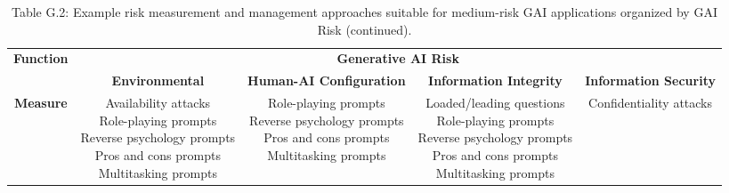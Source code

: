\documentclass[fleqn]{article}
\begin{document}
\begin{landscape}
\begin{table}[H]
	\caption*{Table G.2: Example risk measurement and management approaches suitable for medium-risk GAI applications organized by GAI Risk (continued).}
	\footnotesize
	\begin{tabular}{|c|c|c|c|c|}
		\hline
		\multirow{2}{*}{\textbf{Function}} & \multicolumn{4}{|c|}{\textbf{Generative AI Risk}}   \\
		\cline{2-5}
		& \textbf{Environmental} & \textbf{Human-AI Configuration} & \textbf{Information Integrity} & \textbf{Information Security} \\
		\hline	
		\textbf{Measure} & \makecell[l]{
			\textbullet\hspace{3pt} Availability attacks \\ 
			\textbullet\hspace{3pt} Role-playing prompts \\
			\textbullet\hspace{3pt} Reverse psychology prompts \\
			\textbullet\hspace{3pt} Pros and cons prompts \\
			\textbullet\hspace{3pt} Multitasking prompts \\ 
		}
		& \makecell[l]{
			\textbullet\hspace{3pt} Role-playing prompts \\
			\textbullet\hspace{3pt} Reverse psychology prompts \\
			\textbullet\hspace{3pt} Pros and cons prompts \\
			\textbullet\hspace{3pt} Multitasking prompts \\ 
		}
		& \makecell[l]{
			\textbullet\hspace{3pt} Loaded/leading questions  \\ 
			\textbullet\hspace{3pt} Role-playing prompts \\
			\textbullet\hspace{3pt} Reverse psychology prompts \\
			\textbullet\hspace{3pt} Pros and cons prompts \\
			\textbullet\hspace{3pt} Multitasking prompts \\
		} 
		& \makecell[l]{
			\textbullet\hspace{3pt} Confidentiality attacks  \\ 
}
\end{tabular}
\end{table}
\end{landscape}
\end{document}
